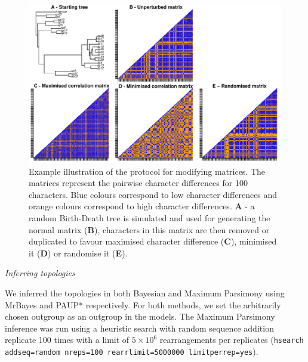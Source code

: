 \documentclass[12pt,letterpaper]{article}
\renewcommand{\subsection}[1]{%
\bigskip
\begin{center}
\begin{large}
\normalfont\itshape #1
\end{large}
\end{center}}
\begin{document}
\begin{figure}[!htbp]
\centering
   \includegraphics[width=1\textwidth]{Figures/Modif_matrix.pdf}
\caption{Example illustration of the protocol for modifying matrices. The matrices represent the pairwise character differences for 100 characters. Blue colours correspond to low character differences and orange colours correspond to high character differences. \textbf{A} - a random Birth-Death tree is simulated and used for generating the normal matrix (\textbf{B}), characters in this matrix are then removed or duplicated to favour maximised character difference (\textbf{C}), minimised it (\textbf{D}) or randomise it (\textbf{E}).}
\label{Fig:modif_matrix}
\end{figure}

\subsection{Inferring topologies}
We inferred the topologies in both Bayesian and Maximum Parsimony using MrBayes \citep[v3.2.6;][]{Ronquist2012mrbayes} and PAUP* \citep[v4.0a151;][]{swofford2001paup} respectively.
For both methods, we set the arbitrarily chosen outgroup as an outgroup in the models.
The Maximum Parsimony inference was run using a heuristic search with random sequence addition replicate 100 times with a limit of $5\times10^6$ rearrangements per replicates (\texttt{hsearch addseq=random nreps=100 rearrlimit=5000000 limitperrep=yes}).
\end{document}
